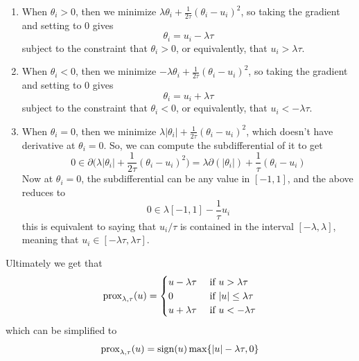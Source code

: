   \begin{enumerate}
    \item When $\theta_i > 0$, then we minimize $\lambda \theta_i + \frac{1}{2\tau} (\theta_i - u_i)^2$, so taking the gradient and setting to $0$ gives 
    \begin{equation}
      \theta_i = u_i - \lambda \tau
    \end{equation}
    subject to the constraint that $\theta_i > 0$, or equivalently, that $u_i > \lambda \tau$. 

    \item When $\theta_i < 0$, then we minimize $-\lambda \theta_i + \frac{1}{2\tau} ( \theta_i - u_i)^2$, so taking the gradient and setting to $0$ gives 
    \begin{equation}
      \theta_i = u_i + \lambda \tau
    \end{equation}
    subject to the constraint that $\theta_i < 0$, or equivalently, that $u_i < -\lambda \tau$. 

    \item When $\theta_i = 0$, then we minimize $\lambda |\theta_i| + \frac{1}{2\tau} (\theta_i - u_i)^2$, which doesn't have derivative at $\theta_i = 0$. So, we can compute the subdifferential of it to get 
    \begin{equation}
      0 \in \partial \bigg( \lambda |\theta_i| + \frac{1}{2\tau} (\theta_i - u_i)^2 \bigg) = \lambda \partial (|\theta_i|) + \frac{1}{\tau} (\theta_i - u_i)
    \end{equation}
    Now at $\theta_i = 0$, the subdifferential can be any value in $[-1, 1]$, and the above reduces to 
    \begin{equation}
      0 \in \lambda [-1, 1] - \frac{1}{\tau} u_i
    \end{equation}
    this is equivalent to saying that $u_i/\tau$ is contained in the interval $[-\lambda, \lambda]$, meaning that $u_i \in [-\lambda \tau, \lambda \tau]$. 
  \end{enumerate}

  Ultimately we get that 
  \begin{equation}
    \operatorname{prox}_{\lambda, \tau} (u) = \begin{cases} u - \lambda \tau & \text{ if } u > \lambda \tau \\ 0 & \text{ if } |u| \leq \lambda \tau \\ u + \lambda \tau & \text{ if } u < - \lambda \tau \end{cases}
  \end{equation}
  which can be simplified to 
  \begin{equation}
    \operatorname{prox}_{\lambda, \tau} (u) = \mathrm{sign}(u) \max\{ |u| - \lambda \tau, 0\}
  \end{equation}


